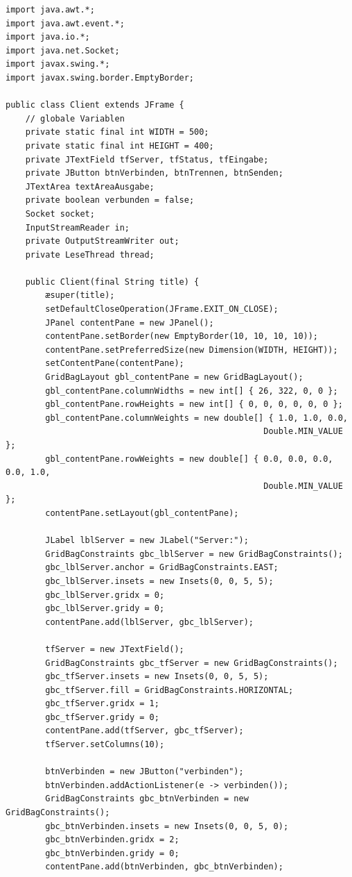 \begin{lstlisting}
import java.awt.*;
import java.awt.event.*;
import java.io.*;
import java.net.Socket;
import javax.swing.*;
import javax.swing.border.EmptyBorder;

public class Client extends JFrame {
    // globale Variablen
    private static final int WIDTH = 500;
    private static final int HEIGHT = 400;
    private JTextField tfServer, tfStatus, tfEingabe;
    private JButton btnVerbinden, btnTrennen, btnSenden;
    JTextArea textAreaAusgabe;
    private boolean verbunden = false;
    Socket socket;
    InputStreamReader in;
    private OutputStreamWriter out;
    private LeseThread thread;

    public Client(final String title) {
        æsuper(title);
        setDefaultCloseOperation(JFrame.EXIT_ON_CLOSE);
        JPanel contentPane = new JPanel();
        contentPane.setBorder(new EmptyBorder(10, 10, 10, 10));
        contentPane.setPreferredSize(new Dimension(WIDTH, HEIGHT));
        setContentPane(contentPane);
        GridBagLayout gbl_contentPane = new GridBagLayout();
        gbl_contentPane.columnWidths = new int[] { 26, 322, 0, 0 };
        gbl_contentPane.rowHeights = new int[] { 0, 0, 0, 0, 0, 0 };
        gbl_contentPane.columnWeights = new double[] { 1.0, 1.0, 0.0, 
        											Double.MIN_VALUE };
        gbl_contentPane.rowWeights = new double[] { 0.0, 0.0, 0.0, 0.0, 1.0,  
                                                    Double.MIN_VALUE };
        contentPane.setLayout(gbl_contentPane);

        JLabel lblServer = new JLabel("Server:");
        GridBagConstraints gbc_lblServer = new GridBagConstraints();
        gbc_lblServer.anchor = GridBagConstraints.EAST;
        gbc_lblServer.insets = new Insets(0, 0, 5, 5);
        gbc_lblServer.gridx = 0;
        gbc_lblServer.gridy = 0;
        contentPane.add(lblServer, gbc_lblServer);

        tfServer = new JTextField();
        GridBagConstraints gbc_tfServer = new GridBagConstraints();
        gbc_tfServer.insets = new Insets(0, 0, 5, 5);
        gbc_tfServer.fill = GridBagConstraints.HORIZONTAL;
        gbc_tfServer.gridx = 1;
        gbc_tfServer.gridy = 0;
        contentPane.add(tfServer, gbc_tfServer);
        tfServer.setColumns(10);

        btnVerbinden = new JButton("verbinden");
        btnVerbinden.addActionListener(e -> verbinden());
        GridBagConstraints gbc_btnVerbinden = new GridBagConstraints();
        gbc_btnVerbinden.insets = new Insets(0, 0, 5, 0);
        gbc_btnVerbinden.gridx = 2;
        gbc_btnVerbinden.gridy = 0;
        contentPane.add(btnVerbinden, gbc_btnVerbinden);


\end{lstlisting}
